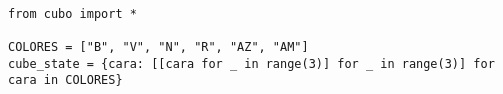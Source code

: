 \begin{lstlisting}

from cubo import *

COLORES = ["B", "V", "N", "R", "AZ", "AM"]
cube_state = {cara: [[cara for _ in range(3)] for _ in range(3)] for cara in COLORES}

\end{lstlisting}